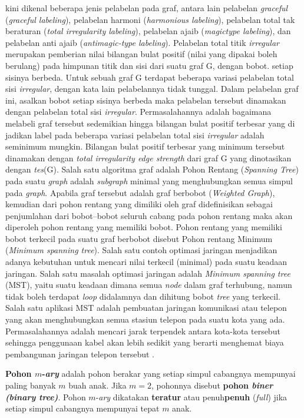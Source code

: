 kini dikenal beberapa jenis pelabelan pada graf, antara lain pelabelan \textit{graceful} (\textit{graceful labeling}), pelabelan harmoni (\textit{harmonious labeling}), pelabelan total tak beraturan (\textit{total irregularity labeling}), pelabelan ajaib (\textit{magictype labeling}), dan pelabelan anti ajaib (\textit{antimagic-type labeling}). Pelabelan total titik \textit{irregular} merupakan pemberian nilai bilangan bulat positif (nilai yang dipakai boleh berulang) pada himpunan titik dan sisi dari suatu graf G, dengan bobot. setiap sisinya berbeda. Untuk sebuah graf G terdapat beberapa variasi pelabelan total sisi \textit{irregular}, dengan kata lain pelabelannya tidak tunggal. Dalam pelabelan graf ini, asalkan bobot setiap sisinya berbeda maka pelabelan tersebut dinamakan dengan pelabelan total sisi \textit{irregular}. Permasalahannya adalah bagaimana melabeli graf tersebut sedemikian hingga bilangan bulat positif terbesar yang di   jadikan   label   pada   beberapa   variasi   pelabelan total sisi \textit{irregular} adalah seminimum mungkin. Bilangan bulat positif terbesar yang minimum tersebut dinamakan dengan \textit{total irregularity edge strength} dari graf G yang dinotasikan dengan \textit{tes}(G). Salah satu algoritma graf adalah Pohon Rentang (\textit{Spanning Tree}) pada suatu \textit{graph} adalah \textit{subgraph} minimal yang menghubungkan semua simpul pada \textit{graph}. Apabila graf tersebut adalah graf berbobot (\textit{Weighted Graph}), kemudian dari pohon rentang yang dimiliki oleh graf didefinisikan sebagai penjumlahan dari bobot–bobot seluruh cabang pada pohon rentang maka akan diperoleh pohon rentang yang memiliki bobot. Pohon rentang yang memiliki bobot terkecil pada suatu graf berbobot disebut Pohon rentang Minimum (\textit{Minimum spanning tree}). Salah satu contoh optimasi jaringan menjadikan adanya kebutuhan untuk mencari nilai terkecil (minimal) pada suatu keadaan jaringan. Salah satu masalah optimasi jaringan adalah \textit{Minimum spanning tree} (MST), yaitu suatu keadaan dimana semua \textit{node} dalam graf terhubung, namun tidak boleh terdapat \textit{loop} didalamnya dan dihitung bobot \textit{tree} yang terkecil. Salah satu aplikasi MST adalah pembuatan jaringan komunikasi atau telepon yang akan menghubungkan semua stasiun telepon pada suatu kota yang ada. Permasalahannya adalah mencari jarak terpendek antara kota-kota tersebut sehingga penggunaan kabel akan lebih sedikit yang berarti menghemat biaya pembangunan jaringan telepon tersebut \citep{Afrianto2012}. 

\textbf{Pohon $m$-\textit{ary}} adalah pohon berakar yang setiap simpul cabangnya mempunyai paling banyak $m$ buah anak. 
Jika $m = 2$, pohonnya disebut \textbf{pohon \textit{biner (binary tree)}}. 
Pohon $m$-\textit{ary} dikatakan \textbf{teratur} atau penuh\textbf{penuh} (\textit{full}) jika setiap simpul cabangnya mempunyai tepat $m$ anak.

